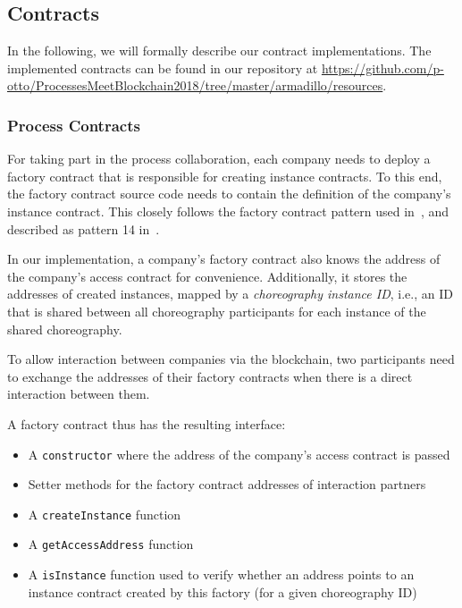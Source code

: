 \documentclass[runningheads]{llncs}
\begin{document}
\subsection{Contracts}

In the following, we will formally describe our contract implementations.
The implemented contracts can be found in our repository at \url{https://github.com/p-otto/ProcessesMeetBlockchain2018/tree/master/armadillo/resources}.

\subsubsection{Process Contracts}

For taking part in the process collaboration, each company needs to deploy a factory contract that is responsible for creating instance contracts.
To this end, the factory contract source code needs to contain the definition of the company's instance contract.
This closely follows the factory contract pattern used in~\cite{weber2016untrusted}, and described as pattern 14 in~\cite{xu2018pattern}.

In our implementation, a company's factory contract also knows the address of the company's access contract for convenience.
Additionally, it stores the addresses of created instances, mapped by a \emph{choreography instance ID}, i.e., an ID that is shared between all choreography participants for each instance of the shared choreography.

To allow interaction between companies via the blockchain, two participants need to exchange the addresses of their factory contracts when there is a direct interaction between them.

A factory contract thus has the resulting interface:
\begin{itemize}
	\item A \texttt{constructor} where the address of the company's access contract is passed
	\item Setter methods for the factory contract addresses of interaction partners
	\item A \texttt{createInstance} function
	\item A \texttt{getAccessAddress} function
	\item A \texttt{isInstance} function used to verify whether an address points to an instance contract created by this factory (for a given choreography ID)
\end{itemize}
\end{document}
